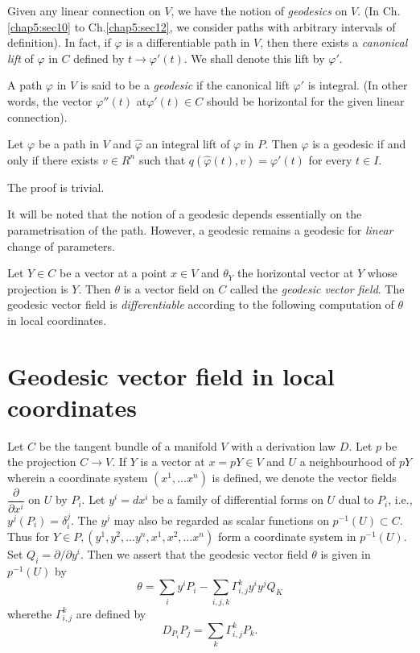 Given any linear connection on $V$, we have the notion of
\textit{geodesics} on $V$. (In Ch.\ref{chap5:sec10} to Ch.\ref{chap5:sec12}, we consider
paths with arbitrary intervals of definition). In fact, if $\varphi$
is a differentiable path in $V$, then there exists a \textit{canonical
  lift} of $\varphi$ in $C$ defined by $t \to \varphi'(t)$. We shall
denote this lift by $\varphi '$. 

\begin{defn}\label{chap5:sec10:def7}%
  A path $\varphi$ in $V$ is said to be a {\em geodesic} if the
  canonical lift $\varphi'$ is integral. (In other words, the vector
  $\varphi''(t)$ at\pageoriginale $\varphi'(t) \in C$ should be horizontal for the
  given linear connection). 
\end{defn} 

\begin{lem}\label{chap5:sec10:lem3}%
  Let $\varphi$ be a path in $V$ and $\hat{\varphi}$ an integral lift
  of $\varphi$ in $P$. Then $\varphi$ is a geodesic if and only if
  there exists $v \in R^n$ such that $q(\hat{\varphi}(t), v) =
  \varphi'(t)$ for every $t \in I$. 
\end{lem}

The proof is trivial.

It will be noted that the notion of a geodesic depends essentially on
the parametrisation of the path. However, a geodesic remains a
geodesic for \textit{linear} change of parameters. 

Let $Y \in C$ be a vector at a point $x \in V$ and $\theta_Y$ the
horizontal vector at $Y$ whose projection is $Y$. Then $\theta$ is a
vector field on $C$ called the \textit{geodesic vector field}. The
geodesic vector field is \textit{differentiable} according to the
following computation of $\theta$ in local coordinates. 

\section{Geodesic vector field in local coordinates}\label{chap5:sec11}%

Let $C$ be the tangent bundle of a manifold $V$ with a derivation law
$D$. Let $p$ be the projection $C \to V$. If $Y$ is a vector at $x = p
Y \in V$ and $U$ a neighbourhood of $pY$ wherein a coordinate system
$(x^1, \ldots x^n)$ is defined, we denote the vector fields
$\dfrac{\partial}{\partial x^i}$ on $U$ by $P_i$. Let $y^i = dx^i$ be
a family of differential forms on $U$ dual to $P_i$, i.e., $y^j(P_i) =
\delta^j_i$. The $y^j$ may also be regarded as scalar functions on
$p^{-1}(U)\subset C$. Thus for $Y \in P, (y^1, y^2, \ldots y^n ,x^1,
x^2, \ldots x^n)$ form a coordinate system in $p^{-1}(U)$. Set $Q_i =
\partial/ \partial y^i$. Then we assert that the geodesic vector field
$\theta$ is given in $p^{-1}(U)$ by 
$$
\theta = \sum_i y^i P_i - \sum_{i,j,k} \Gamma_{i,j}^k y^i y^j Q_K
$$
where\pageoriginale the $\Gamma^k_{i, j}$ are defined by
$$
D_{P_i}P_j = \sum_k \Gamma^k_{i,j} P_k. 
$$

